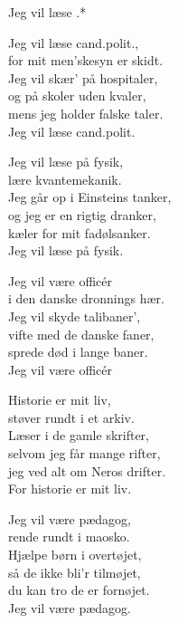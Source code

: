 \begin{song}{Jeg vil læse .*}
  \begin{SBVerse}
    Jeg vil læse cand.polit.,\\
    for mit men'skesyn er skidt.\\
    Jeg vil skær' på hospitaler,\\
    og på skoler uden kvaler,\\
    mens jeg holder falske taler.\\
    Jeg vil læse cand.polit.
  \end{SBVerse}

  \begin{SBVerse}
    Jeg vil læse på fysik,\\
    lære kvantemekanik.\\
    Jeg går op i Einsteins tanker,\\
    og jeg er en rigtig dranker,\\
    kæler for mit fadølsanker.\\
    Jeg vil læse på fysik.
  \end{SBVerse}

  \begin{SBVerse}
    Jeg vil være officér\\
    i den danske dronnings hær.\\
    Jeg vil skyde talibaner',\\
    vifte med de danske faner,\\
    sprede død i lange baner.\\
    Jeg vil være officér
  \end{SBVerse}

  \begin{SBVerse}
    Historie er mit liv,\\
    støver rundt i et arkiv.\\
    Læser i de gamle skrifter,\\
    selvom jeg får mange rifter,\\
    jeg ved alt om Neros drifter.\\
    For historie er mit liv.
  \end{SBVerse}

  \begin{SBVerse}
    Jeg vil være pædagog,\\
    rende rundt i maosko.\\
    Hjælpe børn i overtøjet,\\
    så de ikke bli'r tilmøjet,\\
    du kan tro de er fornøjet.\\
    Jeg vil være pædagog.
  \end{SBVerse}


\end{song}
